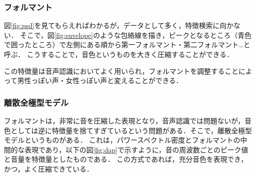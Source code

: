 \documentclass[uplatex,a4paper,11pt]{jsarticle}
\begin{document}
\subsubsection{フォルマント}
図\ref{fig:psd}を見てもらえればわかるが，データとして多く，特徴検索に向かない．
そこで，図\ref{fig:envelope}のような包絡線を描き，ピークとなるところ（青色で囲ったところ）で左側にある順から第一フォルマント・第二フォルマント…と呼ぶ．\cite{iroha}
こうすることで，音色というものを大きく圧縮することができる．

この特徴量は音声認識においてよく用いられ，フォルマントを調整することによって男性っぽい声・女性っぽい声と変えることができる．

\subsubsection{離散全極型モデル}
フォルマントは，非常に音を圧縮した表現となり，音声認識では問題ないが，音色としては逆に特徴量を捨てすぎているという問題がある．そこで，離散全極型モデル\cite{parts}というものがある．
これは，パワースペクトル密度とフォルマントの中間的な表現であり，以下の図\ref{fig:dap}で示すように，音の周波数ごとのピーク値と音量を特徴量としたものである．
この方式であれば，充分音色を表現でき，かつ，よく圧縮できている．
\end{document}
